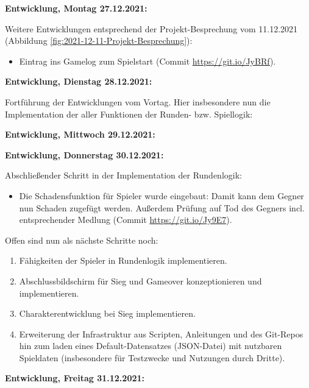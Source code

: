{            \textbf{Entwicklung, Montag 27.12.2021:} \label{ref-runden-impl}

            Weitere Entwicklungen entsprechend der Projekt-Besprechung vom 11.12.2021 (Abbildung \ref{fig:2021-12-11-Projekt-Besprechung}):

            \begin{itemize}
                \item Eintrag ins Gamelog zum Spielstart (Commit \url{https://git.io/JyBRf}).

            \end{itemize}


            \textbf{Entwicklung, Dienstag 28.12.2021:}

            Fortführung der Entwicklungen vom Vortag. Hier insbesondere nun die Implementation der aller Funktionen der Runden- bzw. Spiellogik:


            \textbf{Entwicklung, Mittwoch 29.12.2021:}



            \textbf{Entwicklung, Donnerstag 30.12.2021:}

            Abschließender Schritt in der Implementation der Rundenlogik:

            \begin{itemize}
                \item Die Schadensfunktion für Spieler wurde eingebaut: Damit kann dem Gegner nun Schaden zugefügt werden. Außerdem Prüfung auf Tod des Gegners incl. entsprechender Medlung (Commit \url{https://git.io/Jy9E7}).
            \end{itemize}

            Offen sind nun als nächste Schritte noch:
            \begin{enumerate}
                \item Fähigkeiten der Spieler in Rundenlogik implementieren.
                \item Abschlussbildschirm für Sieg und Gameover konzeptionieren und implementieren. 
                \item Charakterentwicklung bei Sieg implementieren.
                \item Erweiterung der Infrastruktur aus Scripten, Anleitungen und des Git-Repos hin zum laden eines Default-Datensatzes (JSON-Datei) mit nutzbaren Spieldaten (insbesondere für Testzwecke und Nutzungen durch Dritte).
            \end{enumerate}


            \textbf{Entwicklung, Freitag 31.12.2021:}

}
